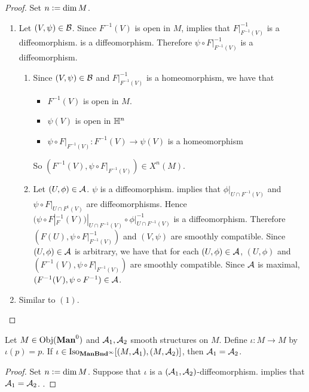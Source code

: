 \documentclass{book}
\begin{document}
\begin{proof} Set $n \vcentcolon= \dim M$. 
	\begin{enumerate}
		\item Let $(V, \psi) \in \mathcal{B}$. Since $F^{-1}(V)$ is open in $M$,  implies that $F|_{F^{-1}(V)}^{-1}$ is a diffeomorphism.  is a diffeomorphism. Therefore $\psi \circ F|_{F^{-1}(V)}^{-1}$ is a diffeomorphism.
		\begin{enumerate}
			\item Since $(V, \psi) \in \mathcal{B}$ and $F|_{F^{-1}(V)}^{-1}$ is a homeomorphism, we have that
			\begin{itemize}
				\item $F^{-1}(V)$ is open in $M$.
				\item $\psi(V)$ is open in $\mathbb{H}^n$
				\item $\psi \circ F|_{F^{-1}(V)}: F^{-1}(V)  \rightarrow \psi(V)$ is a homeomorphism
			\end{itemize}
			So $(F^{-1}(V), \psi \circ F|_{F^{-1}(V)}) \in X^n(M)$. 
			\item Let $(U, \phi) \in \mathcal{A}$.  $\psi$ is a diffeomorphism.  implies that $\phi|_{U \cap F^{-1}(V)}$ and $\psi \circ F|_{U \cap F^{1}(V)}$ are diffeomorphisms. Hence $(\psi \circ F|_F^{-1}(V))|_{U \cap F^{-1}(V)} \circ \phi|_{U \cap F^{-1}(V)}^{-1}$ is a diffeomorphism. Therefore $(F(U), \psi \circ F|_{F^{-1}(V)}^{-1})$ and $(V, \psi)$ are smoothly compatible. Since $(U, \phi) \in \mathcal{A}$ is arbitrary, we have that for each $(U, \phi) \in \mathcal{A}$, $(U, \phi)$ and $(F^{-1}(V), \psi \circ F|_{F^{-1}(V)})$ are smoothly compatible. Since $\mathcal{A}$ is maximal, $(F^{-1}(V), \psi \circ F^{-1}) \in \mathcal{A}$.
		\end{enumerate}
		\item Similar to $(1)$.
	\end{enumerate}
\end{proof}

\begin{ex} 
	Let $M \in \Obj(\Man0)$ and $\mathcal{A}_1, \mathcal{A}_2$ smooth structures on $M$. Define $\iota:M \rightarrow M$ by $\iota(p) = p$. If $\iota \in \operatorname{Iso}_{\operatorname*{\text{\textbf{ManBnd}}^{\infty}}}[(M, \mathcal{A}_1), (M, \mathcal{A}_2)]$, then $\mathcal{A}_1 = \mathcal{A}_2$.
\end{ex}

\begin{proof} Set $n \vcentcolon= \dim M$. 
	Suppose that $\iota$ is a $(\mathcal{A}_1, \mathcal{A}_2)$-diffeomorphism.  implies that $\mathcal{A}_1 = \mathcal{A}_2$. .
\end{proof}
\end{document}
